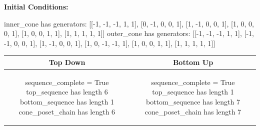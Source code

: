 \documentclass[10pt]{article}
\begin{document}
\textbf{Initial Conditions:}
\begin{SAGE}
inner_cone has generators: 
[[-1, -1, -1, 1, 1], [0, -1, 0, 0, 1], [1, -1, 0, 0, 1], [1, 0, 0, 0, 1], [1, 0, 0, 1, 1], [1, 1, 1, 1, 1]]
outer_cone has generators: 
[[-1, -1, -1, 1, 1], [-1, -1, 0, 0, 1], [1, -1, 0, 0, 1], [1, 0, -1, -1, 1], [1, 0, 0, 1, 1], [1, 1, 1, 1, 1]]

\end{SAGE}
\begin{tabular}{c|c}
\textbf{Top Down} & \textbf{Bottom Up} \\ \hline  
\begin{SAGE}
sequence_complete = True
top_sequence has length 6
bottom_sequence has length 1
cone_poset_chain has length 6
\end{SAGE} 
&
\begin{SAGE}
sequence_complete = True
top_sequence has length 1
bottom_sequence has length 7
cone_poset_chain has length 7
\end{SAGE} 
\\ \hline


\end{tabular}
\end{document}
